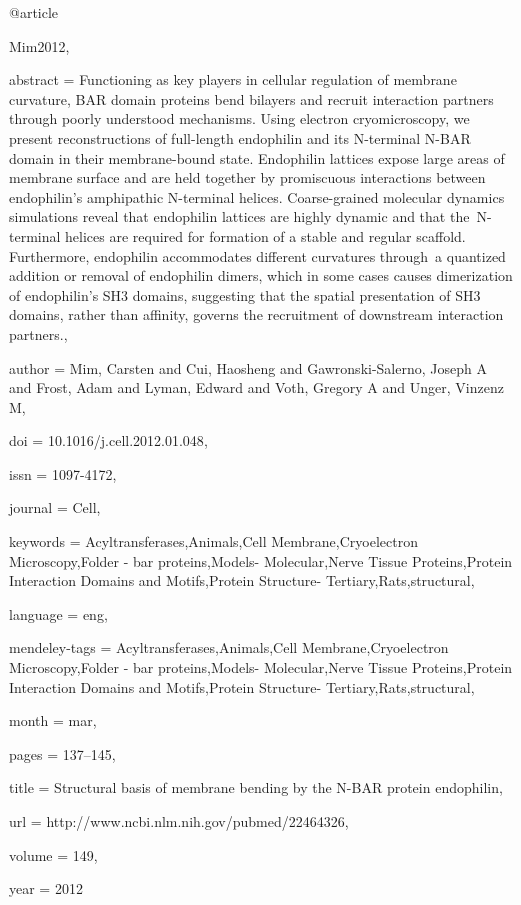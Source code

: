 @article{Mim2012,

abstract = {Functioning as key players in cellular regulation of membrane curvature, BAR domain proteins bend bilayers and recruit interaction partners through poorly understood mechanisms. Using electron cryomicroscopy, we present reconstructions of full-length endophilin and its N-terminal N-BAR domain in their membrane-bound state. Endophilin lattices expose large areas of membrane surface and are held together by promiscuous interactions between endophilin's amphipathic N-terminal helices. Coarse-grained molecular dynamics simulations reveal that endophilin lattices are highly dynamic and that the N-terminal helices are required for formation of a stable and regular scaffold. Furthermore, endophilin accommodates different curvatures through a quantized addition or removal of endophilin dimers, which in some cases causes dimerization of endophilin's SH3 domains, suggesting that the spatial presentation of SH3 domains, rather than affinity, governs the recruitment of downstream interaction partners.},

author = {Mim, Carsten and Cui, Haosheng and Gawronski-Salerno, Joseph A and Frost, Adam and Lyman, Edward and Voth, Gregory A and Unger, Vinzenz M},

doi = {10.1016/j.cell.2012.01.048},

issn = {1097-4172},

journal = {Cell},

keywords = {Acyltransferases,Animals,Cell Membrane,Cryoelectron Microscopy,Folder - bar proteins,Models- Molecular,Nerve Tissue Proteins,Protein Interaction Domains and Motifs,Protein Structure- Tertiary,Rats,structural},

language = {eng},

mendeley-tags = {Acyltransferases,Animals,Cell Membrane,Cryoelectron Microscopy,Folder - bar proteins,Models- Molecular,Nerve Tissue Proteins,Protein Interaction Domains and Motifs,Protein Structure- Tertiary,Rats,structural},

month = {mar},

pages = {137--145},

title = {{Structural basis of membrane bending by the N-BAR protein endophilin}},

url = {http://www.ncbi.nlm.nih.gov/pubmed/22464326},

volume = {149},

year = {2012}

}

